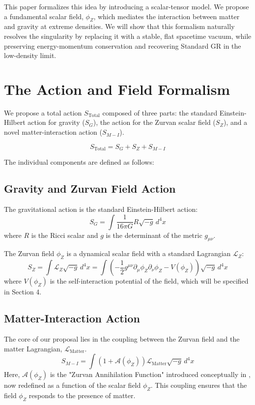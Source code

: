 \documentclass[12pt, a4paper]{article}
\newcommand{\phiZ}{\phi_Z}
\newcommand{\Lmat}{\mathcal{L}_{\text{Matter}}}
\newcommand{\Aphi}{\mathcal{A}(\phiZ)}
\newcommand{\Vphi}{V(\phiZ)}
\begin{document}
This paper formalizes this idea by introducing a scalar-tensor model. We propose a fundamental scalar field, $\phiZ$, which mediates the interaction between matter and gravity at extreme densities. We will show that this formalism naturally resolves the singularity by replacing it with a stable, flat spacetime vacuum, while preserving energy-momentum conservation and recovering Standard GR in the low-density limit.

\section{The Action and Field Formalism}

We propose a total action $S_{\text{Total}}$ composed of three parts: the standard Einstein-Hilbert action for gravity ($S_G$), the action for the Zurvan scalar field ($S_Z$), and a novel matter-interaction action ($S_{M-I}$).

\begin{equation}
S_{\text{Total}} = S_G + S_Z + S_{M-I}
\end{equation}

\noindent The individual components are defined as follows:

\subsection{Gravity and Zurvan Field Action}
The gravitational action is the standard Einstein-Hilbert action:
\begin{equation}
S_G = \int \frac{1}{16\pi G} R \sqrt{-g} \, d^4x
\end{equation}
where $R$ is the Ricci scalar and $g$ is the determinant of the metric $g_{\mu\nu}$.

The Zurvan field $\phiZ$ is a dynamical scalar field with a standard Lagrangian $\mathcal{L}_Z$:
\begin{equation}
S_Z = \int \mathcal{L}_Z \sqrt{-g} \, d^4x = \int \left( -\frac{1}{2} g^{\mu\nu} \partial_\mu \phiZ \partial_\nu \phiZ - \Vphi \right) \sqrt{-g} \, d^4x
\end{equation}
where $\Vphi$ is the self-interaction potential of the field, which will be specified in Section 4.

\subsection{Matter-Interaction Action}
The core of our proposal lies in the coupling between the Zurvan field and the matter Lagrangian, $\Lmat$.
\begin{equation}
S_{M-I} = \int \left( 1 + \Aphi \right) \Lmat \sqrt{-g} \, d^4x
\end{equation}
Here, $\Aphi$ is the "Zurvan Annihilation Function" introduced conceptually in \cite{ahani_dynamic_model}, now redefined as a function of the scalar field $\phiZ$. This coupling ensures that the field $\phiZ$ responds to the presence of matter.
\end{document}
